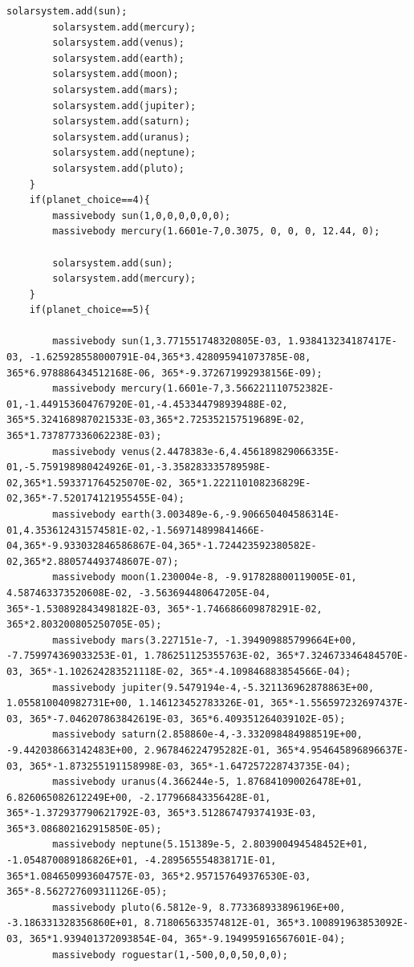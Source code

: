 \documentclass[11pt,a4paper]{article}
\begin{document}
\begin{lstlisting}[title={project3.cpp}]
		solarsystem.add(sun);
		solarsystem.add(mercury);
		solarsystem.add(venus);
		solarsystem.add(earth);
		solarsystem.add(moon);
		solarsystem.add(mars);
		solarsystem.add(jupiter);
		solarsystem.add(saturn);
		solarsystem.add(uranus);
		solarsystem.add(neptune);
		solarsystem.add(pluto);
	}
	if(planet_choice==4){
		massivebody sun(1,0,0,0,0,0,0);
		massivebody mercury(1.6601e-7,0.3075, 0, 0, 0, 12.44, 0);
	
		solarsystem.add(sun);
		solarsystem.add(mercury);
	}
	if(planet_choice==5){

		massivebody sun(1,3.771551748320805E-03, 1.938413234187417E-03, -1.625928558000791E-04,365*3.428095941073785E-08, 365*6.978886434512168E-06, 365*-9.372671992938156E-09);
		massivebody mercury(1.6601e-7,3.566221110752382E-01,-1.449153604767920E-01,-4.453344798939488E-02, 365*5.324168987021533E-03,365*2.725352157519689E-02, 365*1.737877336062238E-03);
		massivebody venus(2.4478383e-6,4.456189829066335E-01,-5.759198980424926E-01,-3.358283335789598E-02,365*1.593371764525070E-02, 365*1.222110108236829E-02,365*-7.520174121955455E-04);
		massivebody earth(3.003489e-6,-9.906650404586314E-01,4.353612431574581E-02,-1.569714899841466E-04,365*-9.933032846586867E-04,365*-1.724423592380582E-02,365*2.880574493748607E-07);
		massivebody moon(1.230004e-8, -9.917828800119005E-01, 4.587463373520608E-02, -3.563694480647205E-04, 365*-1.530892843498182E-03, 365*-1.746686609878291E-02, 365*2.803200805250705E-05);
		massivebody mars(3.227151e-7, -1.394909885799664E+00, -7.759974369033253E-01, 1.786251125355763E-02, 365*7.324673346484570E-03, 365*-1.102624283521118E-02, 365*-4.109846883854566E-04);
		massivebody jupiter(9.5479194e-4,-5.321136962878863E+00, 1.055810040982731E+00, 1.146123452783326E-01, 365*-1.556597232697437E-03, 365*-7.046207863842619E-03, 365*6.409351264039102E-05);
		massivebody saturn(2.858860e-4,-3.332098484988519E+00, -9.442038663142483E+00, 2.967846224795282E-01, 365*4.954645896896637E-03, 365*-1.873255191158998E-03, 365*-1.647257228743735E-04);
		massivebody uranus(4.366244e-5, 1.876841090026478E+01, 6.826065082612249E+00, -2.177966843356428E-01, 365*-1.372937790621792E-03, 365*3.512867479374193E-03, 365*3.086802162915850E-05);
		massivebody neptune(5.151389e-5, 2.803900494548452E+01, -1.054870089186826E+01, -4.289565554838171E-01, 365*1.084650993604757E-03, 365*2.957157649376530E-03, 365*-8.562727609311126E-05);
		massivebody pluto(6.5812e-9, 8.773368933896196E+00, -3.186331328356860E+01, 8.718065633574812E-01, 365*3.100891963853092E-03, 365*1.939401372093854E-04, 365*-9.194995916567601E-04);
		massivebody roguestar(1,-500,0,0,50,0,0);


\end{lstlisting}
\end{document}
